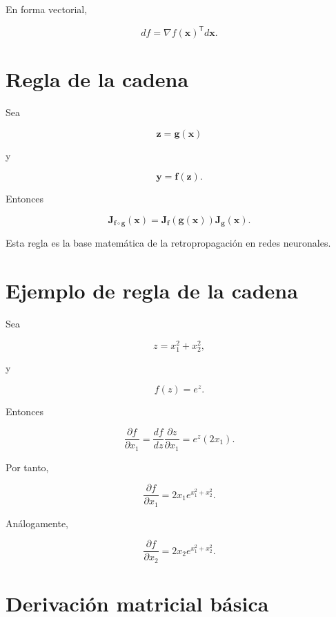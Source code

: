 \documentclass[
  spanish,
  10.5pt,
  letterpaper,
  DIV=11,
  numbers=noendperiod,
  oneside,
  open=any]{scrreprt}
\theoremstyle{definition}
\theoremstyle{definition}
\theoremstyle{plain}
\theoremstyle{remark}
\begin{document}
En forma vectorial,

\[
df
=
\nabla f(\mathbf{x})^{\mathsf T}
d\mathbf{x}.
\]

\section*{Regla de la cadena}\label{regla-de-la-cadena}


Sea

\[
\mathbf{z}
=
\mathbf{g}(\mathbf{x})
\]

y

\[
\mathbf{y}
=
\mathbf{f}(\mathbf{z}).
\]

Entonces

\[
\mathbf{J}_{\mathbf{f}\circ\mathbf{g}}(\mathbf{x})
=
\mathbf{J}_{\mathbf{f}}(\mathbf{g}(\mathbf{x}))
\mathbf{J}_{\mathbf{g}}(\mathbf{x}).
\]

Esta regla es la base matemática de la retropropagación en redes
neuronales.

\section*{Ejemplo de regla de la
cadena}\label{ejemplo-de-regla-de-la-cadena}


Sea

\[
z=x_1^2+x_2^2,
\]

y

\[
f(z)=e^z.
\]

Entonces

\[
\frac{\partial f}{\partial x_1}
=
\frac{df}{dz}
\frac{\partial z}{\partial x_1}
=
e^z(2x_1).
\]

Por tanto,

\[
\frac{\partial f}{\partial x_1}
=
2x_1e^{x_1^2+x_2^2}.
\]

Análogamente,

\[
\frac{\partial f}{\partial x_2}
=
2x_2e^{x_1^2+x_2^2}.
\]

\section*{Derivación matricial
básica}\label{derivaciuxf3n-matricial-buxe1sica}
\end{document}

